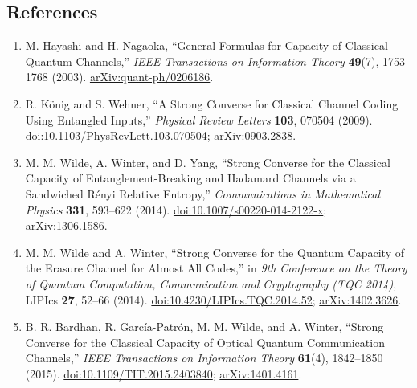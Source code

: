 \subsection*{References}

\begin{enumerate}[label={},leftmargin=4.8em,labelsep=0.5em]
  \footnotesize
  \item[\textup{[HN03]}]\label{ref:5586-hayashi-nagaoka}
  M. Hayashi and H. Nagaoka, ``General Formulas for Capacity of
  Classical-Quantum Channels,'' \emph{IEEE Transactions on Information
  Theory} \textbf{49}(7), 1753--1768 (2003).
  \href{https://arxiv.org/abs/quant-ph/0206186}{arXiv:quant-ph/0206186}.

  \item[\textup{[KW09]}]\label{ref:5586-koenig-wehner}
  R. K\"onig and S. Wehner, ``A Strong Converse for Classical Channel
  Coding Using Entangled Inputs,'' \emph{Physical Review Letters} \textbf{103},
  070504 (2009).
  \href{https://doi.org/10.1103/PhysRevLett.103.070504}{doi:10.1103/PhysRevLett.103.070504};
  \href{https://arxiv.org/abs/0903.2838}{arXiv:0903.2838}.

  \item[\textup{[WWY14]}]\label{ref:5586-wilde-winter-yang}
  M. M. Wilde, A. Winter, and D. Yang, ``Strong Converse for the Classical
  Capacity of Entanglement-Breaking and Hadamard Channels via a Sandwiched
  R\'enyi Relative Entropy,'' \emph{Communications in Mathematical Physics}
  \textbf{331}, 593--622 (2014).
  \href{https://doi.org/10.1007/s00220-014-2122-x}{doi:10.1007/s00220-014-2122-x};
  \href{https://arxiv.org/abs/1306.1586}{arXiv:1306.1586}.

  \item[\textup{[WW14]}]\label{ref:5586-wilde-winter-erasure}
  M. M. Wilde and A. Winter, ``Strong Converse for the Quantum Capacity of
  the Erasure Channel for Almost All Codes,'' in \emph{9th Conference on the
  Theory of Quantum Computation, Communication and Cryptography (TQC 2014)},
  LIPIcs \textbf{27}, 52--66 (2014).
  \href{https://doi.org/10.4230/LIPIcs.TQC.2014.52}{doi:10.4230/LIPIcs.TQC.2014.52};
  \href{https://arxiv.org/abs/1402.3626}{arXiv:1402.3626}.

  \item[\textup{[BGP+15]}]\label{ref:5586-bardhan-et-al}
  B. R. Bardhan, R. Garc\'ia-Patr\'on, M. M. Wilde, and A. Winter,
  ``Strong Converse for the Classical Capacity of Optical Quantum
  Communication Channels,'' \emph{IEEE Transactions on Information Theory}
  \textbf{61}(4), 1842--1850 (2015).
  \href{https://doi.org/10.1109/TIT.2015.2403840}{doi:10.1109/TIT.2015.2403840};
  \href{https://arxiv.org/abs/1401.4161}{arXiv:1401.4161}.


\end{enumerate}
